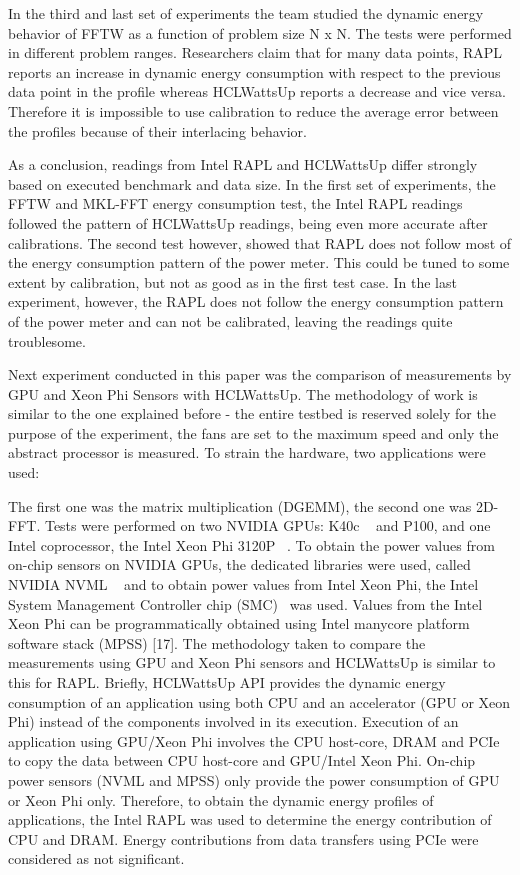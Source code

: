 In the third and last set of experiments the team studied the
dynamic energy behavior of FFTW as a function of problem size
N x N. The tests were performed in different problem ranges.
Researchers claim that for many data points, RAPL reports an
increase in dynamic energy consumption with respect to the
previous data point in the profile whereas HCLWattsUp reports
a decrease and vice versa. Therefore it is impossible to use
calibration to reduce the average error between the profiles
because of their interlacing behavior.

As a conclusion, readings from Intel RAPL and HCLWattsUp differ
strongly based on executed benchmark and data size. In the first
set of experiments, the FFTW and MKL-FFT energy consumption test,
the Intel RAPL readings followed the pattern of HCLWattsUp
readings, being even more accurate after calibrations. The second
test however, showed that RAPL does not follow most of the energy
consumption pattern of the power meter. This could be tuned to
some extent by calibration, but not as good as in the first test
case. In the last experiment, however, the RAPL does not follow
the energy consumption pattern of the power meter and can not be
calibrated, leaving the readings quite troublesome.

Next experiment conducted in this paper was the comparison of
measurements by GPU and Xeon Phi Sensors with HCLWattsUp. The
methodology of work is similar to the one explained before - the
entire testbed is reserved solely for the purpose of the
experiment, the fans are set to the maximum speed and only the
abstract processor is measured. To strain the hardware, two
applications were used:

The first one was the matrix multiplication (DGEMM), the second
one was 2D-FFT. Tests were performed on two NVIDIA GPUs: K40c
~\cite{Implementation_for_Accelerator_Kernels} and P100,
and one Intel coprocessor, the Intel Xeon Phi 3120P
~\cite{Intel_Xeon_Phi_Coprocessor_Architecture}.
To obtain the power values from on-chip sensors on NVIDIA GPUs,
the dedicated libraries were used, called NVIDIA NVML
~\cite{NVML_Reference_Manual} and
to obtain power values from Intel Xeon Phi, the Intel System
Management Controller chip
(SMC)~\cite{Intel_Xeon_Phi_Coprocessor_Developer} was used.
Values from the
Intel Xeon Phi can be programmatically obtained using Intel
manycore platform software stack (MPSS) [17]. The methodology
taken to compare the measurements using GPU and Xeon Phi sensors
and HCLWattsUp is similar to this for RAPL. Briefly, HCLWattsUp
API provides the dynamic energy consumption of an application
using both CPU and an accelerator (GPU or Xeon Phi) instead of
the components involved in its execution. Execution of an
application using GPU/Xeon Phi involves the CPU host-core, DRAM
and PCIe to copy the data between CPU host-core and GPU/Intel
Xeon Phi. On-chip power sensors (NVML and MPSS) only provide
the power consumption of GPU or Xeon Phi only. Therefore, to
obtain the dynamic energy profiles of applications, the Intel
RAPL was used to determine the energy contribution of CPU and
DRAM. Energy contributions from data transfers using PCIe were
considered as not significant.

